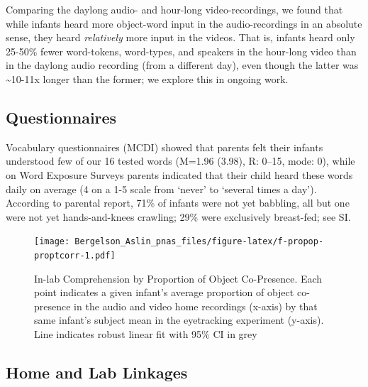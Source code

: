 \documentclass[9pt,twocolumn,twoside,]{pnas-new}
\begin{document}
Comparing the daylong audio- and hour-long video-recordings, we found
that while infants heard more object-word input in the audio-recordings
in an absolute sense, they heard \emph{relatively} more input in the
videos. That is, infants heard only 25-50\% fewer word-tokens,
word-types, and speakers in the hour-long video than in the daylong
audio recording (from a different day), even though the latter was
\textasciitilde{}10-11x longer than the former; we explore this in
ongoing work.

\subsection*{Questionnaires}\label{quests}

Vocabulary questionnaires (MCDI) showed that parents felt their infants
understood few of our 16 tested words (M=1.96 (3.98), R: 0--15, mode:
0), while on Word Exposure Surveys parents indicated that their child
heard these words daily on average (4 on a 1-5 scale from `never' to
`several times a day'). According to parental report, 71\% of infants
were not yet babbling, all but one were not yet hands-and-knees
crawling; 29\% were exclusively breast-fed; see SI.

\begin{figure}[htbp]
\centering
\texttt{[image: Bergelson\_Aslin\_pnas\_files/figure-latex/f-propop-proptcorr-1.pdf]}
\caption{\label{fig:f-propop-proptcorr}In-lab Comprehension by
Proportion of Object Co-Presence. Each point indicates a given infant's
average proportion of object co-presence in the audio and video home
recordings (x-axis) by that same infant's subject mean in the
eyetracking experiment (y-axis). Line indicates robust linear fit with
95\% CI in grey}
\end{figure}

\subsection*{Home and Lab Linkages}\label{home-lab-links}
\end{document}
